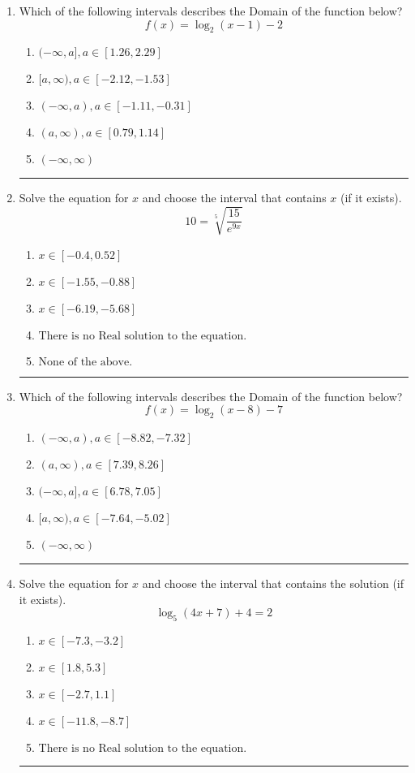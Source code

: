 \documentclass[14pt]{extbook}
\newcommand{\litem}[1]{\item#1\hspace*{-1cm}\rule{\textwidth}{0.4pt}}
\begin{document}
\begin{enumerate}
{\begin{enumerate}[label=\Alph*.]
\end{enumerate} }
\litem{
Which of the following intervals describes the Domain of the function below?\[ f(x) = \log_2{(x-1)}-2 \]\begin{enumerate}[label=\Alph*.]
\item \( (-\infty, a], a \in [1.26, 2.29] \)
\item \( [a, \infty), a \in [-2.12, -1.53] \)
\item \( (-\infty, a), a \in [-1.11, -0.31] \)
\item \( (a, \infty), a \in [0.79, 1.14] \)
\item \( (-\infty, \infty) \)

\end{enumerate} }
\litem{
 Solve the equation for $x$ and choose the interval that contains $x$ (if it exists).\[  10 = \sqrt[5]{\frac{15}{e^{9x}}} \]\begin{enumerate}[label=\Alph*.]
\item \( x \in [-0.4, 0.52] \)
\item \( x \in [-1.55, -0.88] \)
\item \( x \in [-6.19, -5.68] \)
\item \( \text{There is no Real solution to the equation.} \)
\item \( \text{None of the above.} \)

\end{enumerate} }
\litem{
Which of the following intervals describes the Domain of the function below?\[ f(x) = \log_2{(x-8)}-7 \]\begin{enumerate}[label=\Alph*.]
\item \( (-\infty, a), a \in [-8.82, -7.32] \)
\item \( (a, \infty), a \in [7.39, 8.26] \)
\item \( (-\infty, a], a \in [6.78, 7.05] \)
\item \( [a, \infty), a \in [-7.64, -5.02] \)
\item \( (-\infty, \infty) \)

\end{enumerate} }
\litem{
Solve the equation for $x$ and choose the interval that contains the solution (if it exists).\[ \log_{5}{(4x+7)}+4 = 2 \]\begin{enumerate}[label=\Alph*.]
\item \( x \in [-7.3, -3.2] \)
\item \( x \in [1.8, 5.3] \)
\item \( x \in [-2.7, 1.1] \)
\item \( x \in [-11.8, -8.7] \)
\item \( \text{There is no Real solution to the equation.} \)


\end{enumerate}}
\end{enumerate}
\end{document}
